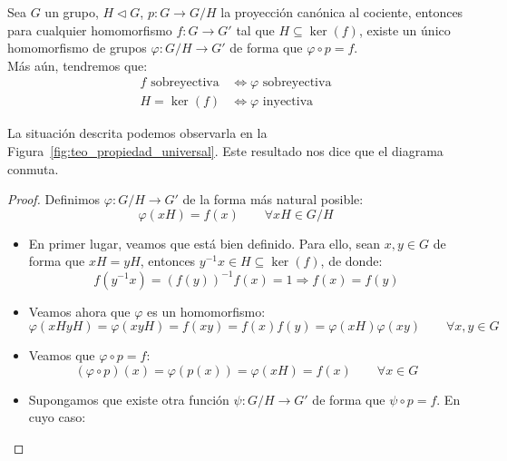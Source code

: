 \begin{teo}\label{teo:prop_universal}
    Sea $G$ un grupo, $H\lhd G$, $p:G\to G/H$ la proyección canónica al cociente, entonces para cualquier homomorfismo $f:G\to G'$ tal que $H\subseteq \ker(f)$, existe un único homomorfismo de grupos $\varphi:G/H\to G'$ de forma que $\varphi\circ p = f$.\\

    \noindent
    Más aún, tendremos que:
    \begin{align*}
        f \text{\ sobreyectiva} &\Longleftrightarrow \varphi \text{\ sobreyectiva}\\
        H = \ker(f) &\Longleftrightarrow \varphi \text{\ inyectiva}
    \end{align*}

    \noindent
    La situación descrita podemos observarla en la Figura~\ref{fig:teo_propiedad_universal}. Este resultado nos dice que el diagrama conmuta.
    \begin{proof}
        Definimos $\varphi:G/H\to G'$ de la forma más natural posible:
        \begin{equation*}
            \varphi(xH) = f(x) \qquad \forall xH \in G/H
        \end{equation*}
        \begin{itemize}
            \item En primer lugar, veamos que está bien definido. Para ello, sean $x,y\in G$ de forma que $xH = yH$, entonces $y^{-1}x\in H\subseteq \ker(f)$, de donde:
                \begin{equation*}
                    f(y^{-1}x) = {(f(y))}^{-1}f(x) = 1 \Longrightarrow f(x) = f(y)
                \end{equation*}
            \item Veamos ahora que $\varphi$ es un homomorfismo:
                \begin{equation*}
                    \varphi(xHyH) = \varphi(xyH) = f(xy) = f(x) f(y) = \varphi(xH)\varphi(xy) \qquad \forall x,y\in G
                \end{equation*}
            \item Veamos que $\varphi\circ p = f$:
                \begin{equation*}
                    (\varphi \circ p)(x) = \varphi(p(x)) = \varphi(xH) = f(x) \qquad \forall x\in G
                \end{equation*}
            \item Supongamos que existe otra función $\psi:G/H\to G'$ de forma que $\psi\circ p = f$. En cuyo caso:

\end{itemize}
\end{proof}
\end{teo}
